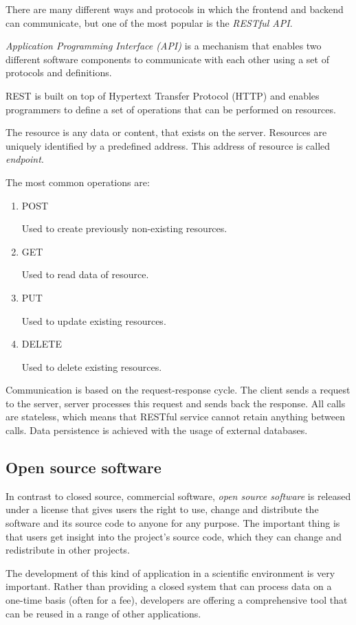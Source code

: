 There are many different ways and protocols in which the frontend and backend can communicate, but one of the most popular is the \emph{RESTful API}.

\emph{Application Programming Interface (API)} is a mechanism that enables two different software components to communicate with each other using a set of protocols and definitions.

REST is built on top of Hypertext Transfer Protocol (HTTP) and enables programmers to define a set of operations that can be performed on resources.

The resource is any data or content, that exists on the server. Resources are uniquely identified by a predefined address. This address of resource is called \emph{endpoint}.

The most common operations are: 

\begin{enumerate}

    \item POST

    Used to create previously non-existing resources.

    \item GET

    Used to read data of resource.

    \item PUT

    Used to update existing resources.

    \item DELETE

    Used to delete existing resources.

\end{enumerate}

Communication is based on the request-response cycle. The client sends a request to the server, server processes this request and sends back the response. All calls are stateless, which means that RESTful service cannot retain anything between calls. Data persistence is achieved with the usage of external databases. \cite{restful_api}

\subsection{Open source software}

In contrast to closed source, commercial software, \emph{open source software} is released under a license that gives users the right to use, change and distribute the software and its source code to anyone for any purpose. The important thing is that users get insight into the project's source code, which they can change and redistribute in other projects. \cite{open_source}

The development of this kind of application in a scientific environment is very important. Rather than providing a closed system that can process data on a one-time basis (often for a fee), developers are offering a comprehensive tool that can be reused in a range of other applications.
